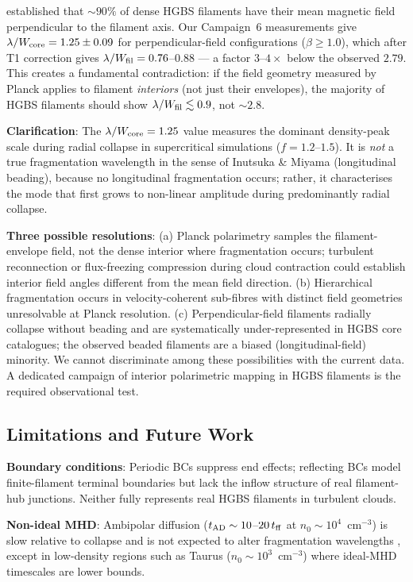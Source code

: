 \documentclass[twoside,twocolumn]{mnras}
\begin{document}
\citet{Planck2016} established that ${\sim}90\%$ of dense HGBS filaments have their
mean magnetic field perpendicular to the filament axis. Our Campaign~6 measurements
give $\lambda/W_{\rm core} = 1.25 \pm 0.09$ for perpendicular-field configurations
($\beta \geq 1.0$), which after T1 correction gives $\lambda/W_{\rm fil} = 0.76$--$0.88$
--- a factor $3$--$4\times$ below the observed $2.79$. This creates a fundamental
contradiction: if the field geometry measured by Planck applies to filament \textit{interiors}
(not just their envelopes), the majority of HGBS filaments should show $\lambda/W_{\rm fil}
\lesssim 0.9$, not ${\sim}2.8$.

\textbf{Clarification}: The $\lambda/W_{\rm core} = 1.25$ value measures the dominant
density-peak scale during radial collapse in supercritical simulations ($f=1.2$--$1.5$).
It is \textit{not} a true fragmentation wavelength in the sense of Inutsuka \& Miyama
(longitudinal beading), because no longitudinal fragmentation occurs; rather, it
characterises the mode that first grows to non-linear amplitude during predominantly
radial collapse.

\textbf{Three possible resolutions}: (a) Planck polarimetry samples the filament-envelope
field, not the dense interior where fragmentation occurs; turbulent reconnection or
flux-freezing compression during cloud contraction could establish interior field angles
different from the mean field direction. (b) Hierarchical fragmentation occurs in
velocity-coherent sub-fibres with distinct field geometries unresolvable at Planck
resolution. (c) Perpendicular-field filaments radially collapse without beading and are
systematically under-represented in HGBS core catalogues; the observed beaded filaments
are a biased (longitudinal-field) minority. We cannot discriminate among these
possibilities with the current data. A dedicated campaign of interior polarimetric
mapping in HGBS filaments is the required observational test.

\subsection{Limitations and Future Work}

\textbf{Boundary conditions}: Periodic BCs suppress end effects; reflecting BCs model
finite-filament terminal boundaries but lack the inflow structure of real filament-hub
junctions. Neither fully represents real HGBS filaments in turbulent clouds.

\textbf{Non-ideal MHD}: Ambipolar diffusion ($t_{\rm AD} \sim 10$--$20\,t_{\rm ff}$ at
$n_0 \sim 10^4$~cm$^{-3}$) is slow relative to collapse and is not expected to alter
fragmentation wavelengths \citep{Nakamura2005, Tassis2004}, except in low-density regions
such as Taurus ($n_0 \sim 10^3$~cm$^{-3}$) where ideal-MHD timescales are lower bounds.
\end{document}
